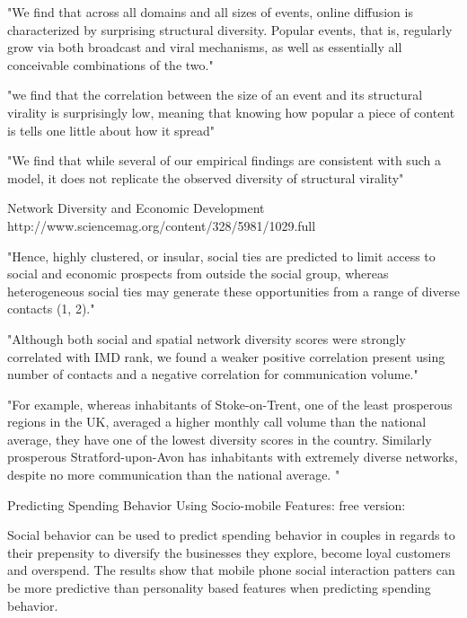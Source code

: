 "We find that across all domains and all sizes of events, online diffusion is characterized by surprising structural diversity. Popular events, that is, regularly grow via both broadcast and viral mechanisms, as well as essentially all conceivable combinations of the two."

"we find that the correlation between the size of an event and its structural virality is surprisingly low, meaning that knowing how popular a piece of content is tells one little about how it spread"

"We find that while several of our empirical findings are consistent with such a model, it does not replicate the observed diversity of structural virality"











Network Diversity and Economic Development
http://www.sciencemag.org/content/328/5981/1029.full



"Hence, highly clustered, or insular, social ties are predicted to limit access to social and economic prospects from outside the social group, whereas heterogeneous social ties may generate these opportunities from a range of diverse contacts (1, 2)."

"Although both social and spatial network diversity scores were strongly correlated with IMD rank, we found a weaker positive correlation present using number of contacts and a negative correlation for communication volume."

"For example, whereas inhabitants of Stoke-on-Trent, one of the least prosperous regions in the UK, averaged a higher monthly call volume than the national average, they have one of the lowest diversity scores in the country. Similarly prosperous Stratford-upon-Avon has inhabitants with extremely diverse networks, despite no more communication than the national average. "




Predicting Spending Behavior Using Socio-mobile Features:
free version:

Social behavior can be used to predict spending behavior in couples in regards to their prepensity to diversify the businesses they explore, become loyal customers and overspend. The results show that mobile phone social interaction patters can be more predictive than personality based features when predicting spending behavior. 

